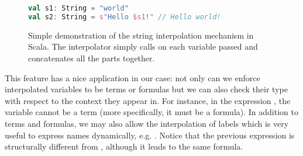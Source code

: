 \begin{figure}[H]
  \centering
  \begin{lstlisting}[language=Scala]
val s1: String = "world"
val s2: String = s"Hello $s1!" // Hello world!
  \end{lstlisting}
  \caption[String interpolation general example]{Simple demonstration of the string interpolation mechanism in Scala. The  interpolator simply calls  on each variable passed and concatenates all the parts together.}
  \label{fig:string-interpolation-general}
\end{figure}

This feature has a nice application in our case: not only can we enforce interpolated variables to be terms or formulas but we can also check their type with respect to the context they appear in. For instance, in the expression , the variable  cannot be a term (more specifically, it must be a formula). In addition to terms and formulas, we may also allow the interpolation of labels which is very useful to express names dynamically, e.g. . Notice that the previous expression is structurally different from , although it leads to the same formula.

